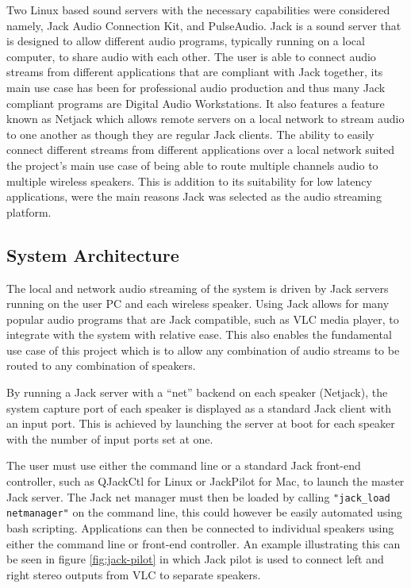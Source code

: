 \documentclass[main.tex]{subfiles}
\begin{document}
\medskip
Two Linux based sound servers with the necessary capabilities were considered namely, Jack Audio Connection Kit, and PulseAudio. 
Jack is a sound server that is designed to allow different audio programs, typically running on a local computer, to share audio with each other.
The user is able to connect audio streams from different applications that are compliant with Jack together, its main use case has been for professional audio production and thus many Jack compliant programs are Digital Audio Workstations.
It also features a feature known as Netjack which allows remote servers on a local network to stream audio to one another as though they are regular Jack clients.
The ability to easily connect different streams from different applications over a local network suited the project's main use case of being able to route multiple channels audio to multiple wireless speakers.
This is addition to its suitability for low latency applications, were the main reasons Jack was selected as the audio streaming platform. 

\subsection{System Architecture}
The local and network audio streaming of the system is driven by Jack servers running on the user PC and each wireless speaker.
Using Jack allows for many popular audio programs that are Jack compatible, such as VLC media player, to integrate with the system with relative ease.
This also enables the fundamental use case of this project which is to allow any combination of audio streams to be routed to any combination of speakers.

\medskip
By running a Jack server with a ``net'' backend on each speaker (Netjack), the system capture port of each speaker is displayed as a standard Jack client with an input port. 
This is achieved by launching the server at boot for each speaker with the number of input ports set at one.
 
The user must use either the command line or a standard Jack front-end controller, such as QJackCtl for Linux or JackPilot for Mac, to launch the master Jack server. 
The Jack net manager must then be loaded by calling \lstinline{"jack_load netmanager"}  on the command line, this could however be easily automated using bash scripting.
Applications can then be connected to individual speakers using either the command line or front-end controller.
An example illustrating this can be seen in figure \ref{fig:jack-pilot} in which Jack pilot is used to connect left and right stereo outputs from VLC to separate speakers. 
\end{document}
